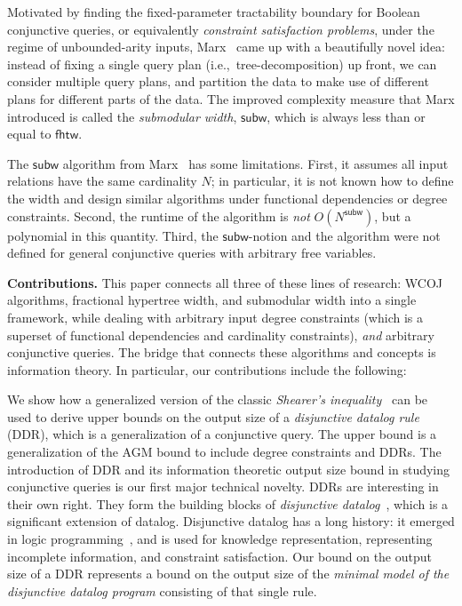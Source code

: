 \documentclass{theoretics}
\newcommand{\agm}{\textsf{AGM}\xspace}
\newcommand{\fhtw}{\textsf{fhtw}}
\newcommand{\subm}{\textsf{subw}}
\begin{document}
Motivated by finding the fixed-parameter tractability boundary for Boolean conjunctive
queries, or equivalently {\em constraint satisfaction problems}, under the regime of
unbounded-arity inputs, Marx~\cite{DBLP:journals/jacm/Marx13} came up with a beautifully
novel idea: instead of fixing a single query plan (i.e.,~tree-decomposition)
up front, we can consider multiple query
plans, and partition the data to make use of different plans for different parts of the
data. The improved complexity measure that Marx introduced is called the {\em submodular
width}, $\subm$, which is always less than or equal to $\fhtw$.

The $\subm$ algorithm from Marx~\cite{DBLP:journals/jacm/Marx13} has some limitations. First,
it assumes all input relations have the same cardinality $N$; in particular, it is not known
how to define the width and design similar algorithms under functional dependencies or degree
constraints. Second, the runtime of the
algorithm is {\em not} $O(N^{\subm})$, but a polynomial in this quantity.
Third, the $\subm$-notion and the algorithm were not defined for general conjunctive queries
with arbitrary free variables.

\textbf{Contributions.}
This paper connects all three of these lines of research: WCOJ algorithms, fractional
hypertree width, and submodular width into a single framework, while dealing with arbitrary
input degree constraints (which is a superset of functional dependencies and cardinality
constraints), {\em and} arbitrary conjunctive queries. The bridge that connects these
algorithms and concepts is information theory. In particular, our contributions include the
following:

We show how a generalized version of the classic {\em Shearer's inequality}~\cite{MR1639767}
can be used to derive upper bounds on the output size of a {\em disjunctive datalog rule}
(DDR), which is a generalization of a conjunctive query.
The upper bound is a generalization of the \agm bound to include degree constraints and
DDRs. The introduction of DDR and its information theoretic output size bound in studying
conjunctive queries is our first major technical novelty.
%
DDRs are interesting in their own right. They form the building blocks of
\emph{disjunctive datalog}~\cite{DBLP:journals/tods/EiterGM97}, which is a significant
extension of datalog.  Disjunctive datalog has a long history: it emerged in logic
programming~\cite{DBLP:books/daglib/0069187,DBLP:journals/amai/Minker94}, and is used for
knowledge representation, representing incomplete information, and constraint satisfaction.
Our bound on the output size of a DDR represents a bound on the output size of the
\emph{minimal model of the disjunctive datalog program} consisting of that single rule.
\end{document}
